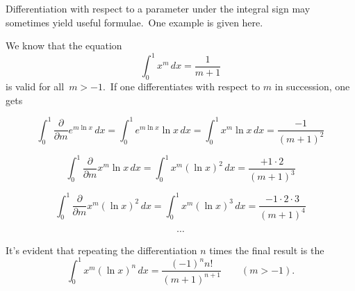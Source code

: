 \documentclass[12pt]{article}
\theoremstyle{definition}
\begin{document}
Differentiation with respect to a parameter under the integral sign may sometimes yield useful formulae.\, One example is given here.

We know that the equation
$$\int_0^1x^m\,dx = \frac{1}{m+1}$$
is valid for all\, $m > -1$.\, If one differentiates with respect to $m$  in succession, one gets

$$\int_0^1\frac{\partial}{\partial m}e^{m\ln{x}}\,dx 
= \int_0^1 e^{m\ln{x}}\ln{x}\,dx = \int_0^1x^m\ln{x}\,dx 
= \frac{-1}{(m+1)^2}$$

$$\int_0^1\frac{\partial}{\partial m}x^m\ln{x}\,dx = \int_0^1x^m(\ln{x})^2\,dx = \frac{+1\cdot2}{(m+1)^3}$$

$$\int_0^1\frac{\partial}{\partial m}x^m(\ln{x})^2\,dx = \int_0^1x^m(\ln{x})^3\,dx = \frac{-1\cdot2\cdot3}{(m+1)^4}$$

$$\cdots$$

It's evident that repeating the differentiation $n$ times the final result is the 
$$ \int_0^1x^m(\ln{x})^n\,dx = \frac{(-1)^n n!}{(m+1)^{n+1}} \qquad(m > -1).$$


\end{document}
